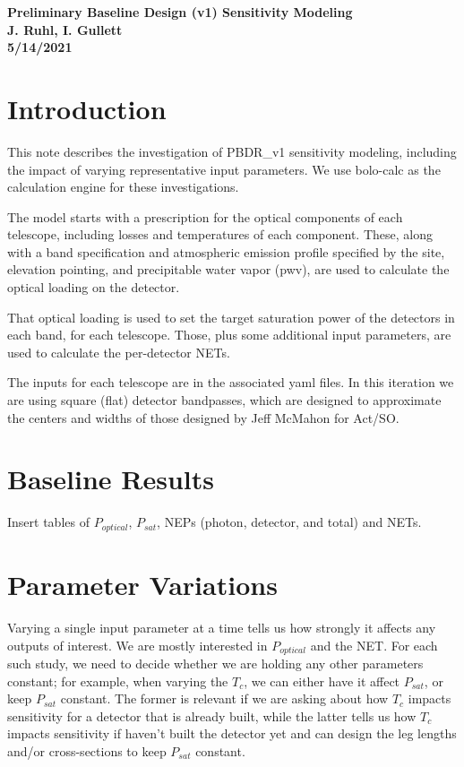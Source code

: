 \documentclass[11pt]{article}
\begin{document}
\begin{center}
\bf Preliminary Baseline Design (v1) Sensitivity Modeling \\
J. Ruhl, I. Gullett\\
5/14/2021
\end{center}

\section{Introduction}

This note describes the investigation of PBDR\_v1 sensitivity modeling, including the impact of varying representative input parameters.  
We use bolo-calc as the calculation engine for these investigations.

The model starts with a prescription for the optical components of each telescope, including losses and temperatures of each component.  These, along with a band specification and atmospheric emission profile specified by the site, elevation pointing, and precipitable water vapor (pwv), are used to calculate the optical loading on the detector.

That optical loading is used to set the target saturation power of the detectors in each band, for each telescope.  Those, plus some additional input parameters, are used to calculate the per-detector NETs.  

The inputs for each telescope are in the associated yaml files.  In this iteration we are using square (flat) detector bandpasses, which are designed to approximate the centers and widths of those designed by Jeff McMahon for Act/SO.


\section{Baseline Results}

Insert tables of $P_{optical}$, $P_{sat}$, NEPs (photon, detector, and total) and NETs.


\section{Parameter Variations}

Varying a single input parameter at a time tells us how strongly it affects any outputs of interest.  We are mostly interested in 
$P_{optical}$ and the NET.   For each such study, we need to decide whether we are holding any other parameters constant;  
for example, when varying the $T_c$, we can either have it affect $P_{sat}$, or keep $P_{sat}$ constant.   The former is relevant if we are asking about how $T_c$ impacts sensitivity for a detector that is already built, while the latter tells us how $T_c$ impacts sensitivity if haven't
built the detector yet and can design the leg lengths and/or cross-sections to keep $P_{sat}$ constant.
\end{document}
